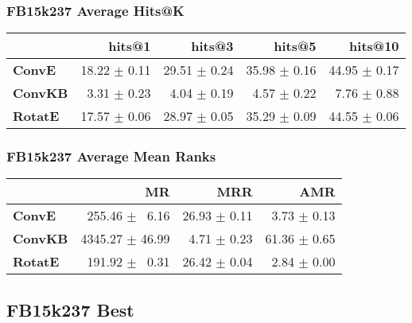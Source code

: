 \documentclass{article}
\begin{document}
\subsubsection{FB15k237 Average Hits@K}
    \begin{center}
    \begin{tabular}{lrrrr}
\toprule
{} &        hits@1 &        hits@3 &        hits@5 &       hits@10 \\
\midrule
\textbf{ConvE } &  18.22 $\pm$ 0.11 &  29.51 $\pm$ 0.24 &  35.98 $\pm$ 0.16 &  44.95 $\pm$ 0.17 \\
\textbf{ConvKB} &  $\phantom{5}$3.31 $\pm$ 0.23 &  $\phantom{5}$4.04 $\pm$ 0.19 &  $\phantom{5}$4.57 $\pm$ 0.22 &  $\phantom{5}$7.76 $\pm$ 0.88 \\
\textbf{RotatE} &  17.57 $\pm$ 0.06 &  28.97 $\pm$ 0.05 &  35.29 $\pm$ 0.09 &  44.55 $\pm$ 0.06 \\
\bottomrule
\end{tabular}

    \end{center}
\subsubsection{FB15k237 Average Mean Ranks}
    \begin{center}
    \begin{tabular}{lrrr}
\toprule
{} &               MR &           MRR &           AMR \\
\midrule
\textbf{ConvE } &  $\phantom{5}$255.46 $\pm$ $\phantom{5}$6.16 &  26.93 $\pm$ 0.11 &  $\phantom{5}$3.73 $\pm$ 0.13 \\
\textbf{ConvKB} &  4345.27 $\pm$ 46.99 &  $\phantom{5}$4.71 $\pm$ 0.23 &  61.36 $\pm$ 0.65 \\
\textbf{RotatE} &  $\phantom{5}$191.92 $\pm$ $\phantom{5}$0.31 &  26.42 $\pm$ 0.04 &  $\phantom{5}$2.84 $\pm$ 0.00 \\
\bottomrule
\end{tabular}

    \end{center}
\subsection{FB15k237 Best}
\end{document}
